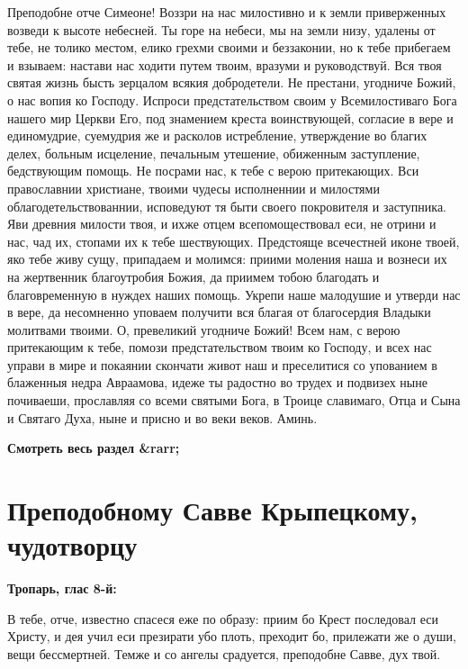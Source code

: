 Преподобне отче Симеоне! Воззри на нас милостивно и к земли приверженных возведи к высоте небесней. Ты горе на небеси, мы на земли низу, удалены от тебе, не толико местом, елико грехми своими и беззаконии, но к тебе прибегаем и взываем: настави нас ходити путем твоим, вразуми и руководствуй. Вся твоя святая жизнь бысть зерцалом всякия добродетели. Не престани, угодниче Божий, о нас вопия ко Господу. Испроси предстательством своим у Всемилостиваго Бога нашего мир Церкви Его, под знамением креста воинствующей, согласие в вере и единомудрие, суемудрия же и расколов истребление, утверждение во благих делех, больным исцеление, печальным утешение, обиженным заступление, бедствующим помощь. Не посрами нас, к тебе с верою притекающих. Вси православнии христиане, твоими чудесы исполненнии и милостями облагодетельствованнии, исповедуют тя быти своего покровителя и заступника. Яви древния милости твоя, и ихже отцем всепомоществовал еси, не отрини и нас, чад их, стопами их к тебе шествующих. Предстояще всечестней иконе твоей, яко тебе живу сущу, припадаем и молимся: приими моления наша и вознеси их на жертвенник благоутробия Божия, да приимем тобою благодать и благовременную в нуждех наших помощь. Укрепи наше малодушие и утверди нас в вере, да несомненно уповаем получити вся благая от благосердия Владыки молитвами твоими. О, превеликий угодниче Божий! Всем нам, с верою притекающим к тебе, помози предстательством твоим ко Господу, и всех нас управи в мире и покаянии скончати живот наш и преселитися со упованием в блаженныя недра Авраамова, идеже ты радостно во трудех и подвизех ныне почиваеши, прославляя со всеми святыми Бога, в Троице славимаго, Отца и Сына и Святаго Духа, ныне и присно и во веки веков. Аминь.


\mychapterending


\bfseries Смотреть весь раздел &rarr;\normalfont{} 

\section{Преподобному Савве Крыпецкому, чудотворцу}
 


\bfseries Тропарь, глас 8-й:\normalfont{}


В тебе, отче, известно спасеся еже по образу: приим бо Крест последовал еси Христу, и дея учил еси презирати убо плоть, преходит бо, прилежати же о души, вещи бессмертней. Темже и со ангелы срадуется, преподобне Савве, дух твой.


